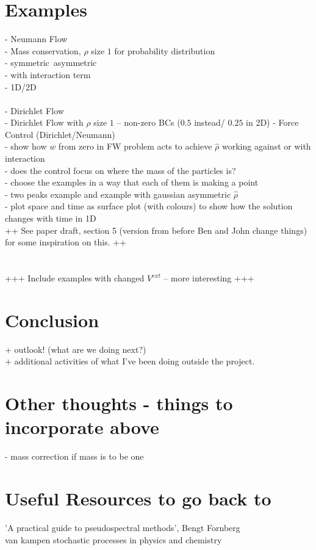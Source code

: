 \documentclass[11pt, a4paper]{article}
\theoremstyle{definition}
\begin{document}
\section{Examples}
- Neumann Flow\\
- Mass conservation, $\rho$ size $1$ for probability distribution\\
- symmetric\ asymmetric\\
- with interaction term \\
- 1D/2D \\
\\
- Dirichlet Flow \\
- Dirichlet Flow with $\rho$ size $1$ -- non-zero BCs ($0.5$ instead/ $0.25$ in 2D)
- Force Control (Dirichlet/Neumann) \\
- show how $w$ from zero in FW problem acts to achieve $\hat \rho$ working against or with interaction\\
- does the control focus on where the mass of the particles is?\\
- choose the examples in a way that each of them is making a point\\
- two peaks example and example with gaussian asymmetric $\hat \rho$\\
- plot space and time as surface plot (with colours) to show how the solution changes with time in 1D\\

++ See paper draft, section 5 (version from before Ben and John change things) for some inspiration on this. ++ \\
\\
\\
+++ Include examples with changed $V^{ext}$ -- more interesting +++


\section{Conclusion}
+ outlook! (what are we doing next?)\\
+ additional activities of what I've been doing outside the project.


\pagebreak	



\pagebreak
\appendix

\section{Other thoughts - things to incorporate above}
- mass correction if mass is to be one\\


\section{Useful Resources to go back to}
'A practical guide to pseudospectral methods', Bengt Fornberg\\
van kampen stochastic processes in physics and chemistry
\end{document}
